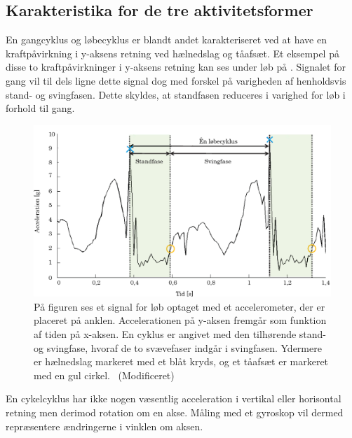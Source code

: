 \subsection{Karakteristika for de tre aktivitetsformer}
En gangcyklus og løbecyklus er blandt andet karakteriseret ved at have en kraftpåvirkning i y-aksens retning ved hælnedslag og tåafsæt. Et eksempel på disse to kraftpåvirkninger i y-aksens retning kan ses under løb på . Signalet for gang vil til dels ligne dette signal dog med forskel på varigheden af henholdsvis stand- og svingfasen. Dette skyldes, at standfasen reduceres i varighed for løb i forhold til gang.
\begin{figure}[H]
	\centering
	\includegraphics[scale=0.3]{figures/bProblemloesning/loeb_skolebog.png}
	\caption{På figuren ses et signal for løb optaget med et accelerometer, der er placeret på anklen. Accelerationen på y-aksen fremgår som funktion af tiden på x-aksen. En cyklus er angivet med den tilhørende stand- og svingfase, hvoraf de to svævefaser indgår i svingfasen. Ydermere er hælnedslag markeret med et blåt kryds, og et tåafsæt er markeret med en gul cirkel.~\citep{Strohrmann2011} (Modificeret)}
	\label{fig:loeb_skolebog}
\end{figure}\vspace{-0.25cm}
En cykelcyklus har ikke nogen væsentlig acceleration i vertikal eller horisontal retning men derimod rotation om en akse. Måling med et gyroskop vil dermed repræsentere ændringerne i vinklen om aksen.~\citep{Cockcroft2011,Marin-PerianuMarin-Perianu2013} 
